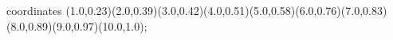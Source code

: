 					coordinates { (1.0,0.23)(2.0,0.39)(3.0,0.42)(4.0,0.51)(5.0,0.58)(6.0,0.76)(7.0,0.83)(8.0,0.89)(9.0,0.97)(10.0,1.0)};